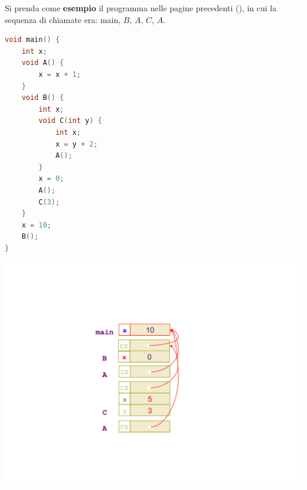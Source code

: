 \documentclass[a4paper]{article}
\begin{document}
	\noindent
	Si prenda come \textcolor{Green4}{\textbf{esempio}} il programma nelle pagine precedenti (\pageref{esempio risolvere riferimenti}), in cui la sequenza di chiamate era: \textsf{main}, $B$, $A$, $C$, $A$.\newline
	\begin{minipage}{.4\textwidth}
		\begin{lstlisting}[language=C]
void main() {
	int x;
	void A() {
		x = x + 1;
	}
	void B() {
		int x;
		void C(int y) {
			int x;
			x = y + 2;
			A();
		}
		x = 0;
		A();
		C(3);
	}
	x = 10;
	B();
}\end{lstlisting}
	\end{minipage}
	\begin{minipage}{.6\textwidth}
		\begin{center}
			\includegraphics[width=.6\textwidth]{img/link-statici-3.pdf}
		\end{center}
	\end{minipage}
	
\end{document}
